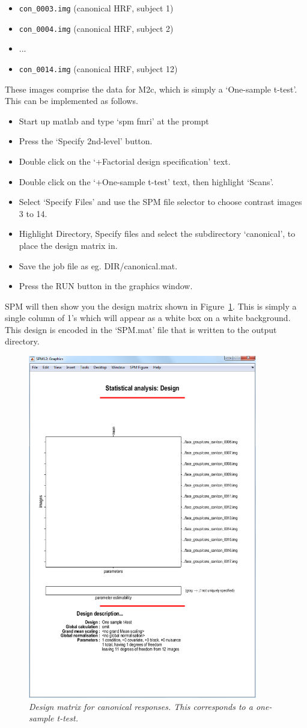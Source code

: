\documentclass[a4paper,titlepage]{book}
\newcommand{\bi}{\begin{itemize}}
\newcommand{\ei}{\end{itemize}}
\begin{document}
\bi
\item{\verb!con_0003.img!		(canonical HRF, subject 1)}
\item{\verb!con_0004.img!		(canonical HRF, subject 2)}
\item{...}
\item{\verb!con_0014.img!		(canonical HRF, subject 12)}
\ei
These images comprise the data for M2c, which is simply a `One-sample t-test'. This can be implemented as follows.
\bi
\item{Start up matlab and type `spm fmri' at the prompt}
\item{Press the `Specify 2nd-level' button.}
\item{Double click on the `+Factorial design specification' text.}
\item{Double click on the `+One-sample t-test' text, then highlight `Scans'.} 
\item{Select `Specify Files' and use the SPM file selector
to choose contrast images 3 to 14.}
\item{Highlight Directory, Specify files and select the 
subdirectory `canonical', to place the design matrix in.}
\item{Save the job file as eg. {\sf DIR/canonical.mat}}.
\item{Press the RUN button in the graphics window.}
\ei
SPM will then show you the design matrix shown in Figure~\ref{t1}. This is simply a single column of 1's which will appear as a white box on a white background. This design is encoded in the `SPM.mat' file that is written to the output directory.
\begin{figure}
\begin{center}
\includegraphics[width=100mm]{faces_group/t1}
\caption{\em Design matrix for canonical responses. This corresponds to a one-sample t-test. \label{t1}}
\end{center}
\end{figure}
\end{document}
